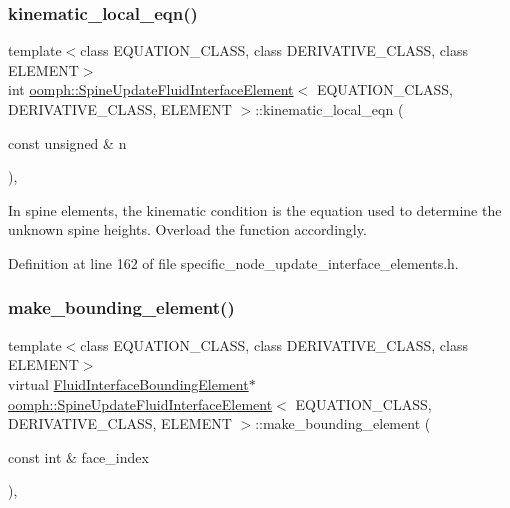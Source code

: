 \subsubsection{\texorpdfstring{kinematic\+\_\+local\+\_\+eqn()}{kinematic\_local\_eqn()}}
{\footnotesize\ttfamily template$<$class E\+Q\+U\+A\+T\+I\+O\+N\+\_\+\+C\+L\+A\+SS, class D\+E\+R\+I\+V\+A\+T\+I\+V\+E\+\_\+\+C\+L\+A\+SS, class E\+L\+E\+M\+E\+NT$>$ \\
int \hyperlink{classoomph_1_1SpineUpdateFluidInterfaceElement}{oomph\+::\+Spine\+Update\+Fluid\+Interface\+Element}$<$ E\+Q\+U\+A\+T\+I\+O\+N\+\_\+\+C\+L\+A\+SS, D\+E\+R\+I\+V\+A\+T\+I\+V\+E\+\_\+\+C\+L\+A\+SS, E\+L\+E\+M\+E\+NT $>$\+::kinematic\+\_\+local\+\_\+eqn (\begin{DoxyParamCaption}\item[{const unsigned \&}]{n }\end{DoxyParamCaption})\hspace{0.3cm}{\ttfamily [inline]}, {\ttfamily [private]}}



In spine elements, the kinematic condition is the equation used to determine the unknown spine heights. Overload the function accordingly. 



Definition at line 162 of file specific\+\_\+node\+\_\+update\+\_\+interface\+\_\+elements.\+h.

\mbox{\label{classoomph_1_1SpineUpdateFluidInterfaceElement_a8e464c689a19ce2d6fbff2c167dcc41a}} 
\subsubsection{\texorpdfstring{make\+\_\+bounding\+\_\+element()}{make\_bounding\_element()}}
{\footnotesize\ttfamily template$<$class E\+Q\+U\+A\+T\+I\+O\+N\+\_\+\+C\+L\+A\+SS, class D\+E\+R\+I\+V\+A\+T\+I\+V\+E\+\_\+\+C\+L\+A\+SS, class E\+L\+E\+M\+E\+NT$>$ \\
virtual \hyperlink{classoomph_1_1FluidInterfaceBoundingElement}{Fluid\+Interface\+Bounding\+Element}$\ast$ \hyperlink{classoomph_1_1SpineUpdateFluidInterfaceElement}{oomph\+::\+Spine\+Update\+Fluid\+Interface\+Element}$<$ E\+Q\+U\+A\+T\+I\+O\+N\+\_\+\+C\+L\+A\+SS, D\+E\+R\+I\+V\+A\+T\+I\+V\+E\+\_\+\+C\+L\+A\+SS, E\+L\+E\+M\+E\+NT $>$\+::make\+\_\+bounding\+\_\+element (\begin{DoxyParamCaption}\item[{const int \&}]{face\+\_\+index }\end{DoxyParamCaption})\hspace{0.3cm}{\ttfamily [inline]}, {\ttfamily [virtual]}}



